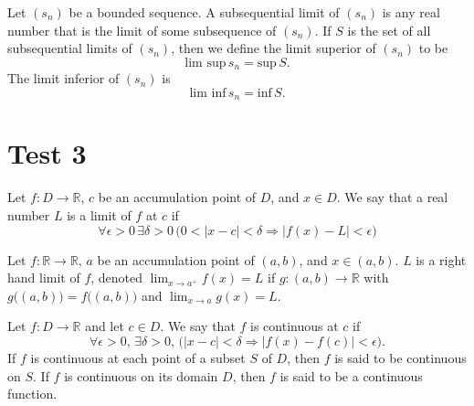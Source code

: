 \documentclass[nobib,notoc]{tufte-handout}
\begin{document}
\begin{defi}
	Let \((s_n)\) be a bounded sequence. A subsequential limit of \((s_n)\) is any real number that is the limit of some subsequence of \((s_n)\). If \(S\) is the set of all subsequential limits of \((s_n)\), then we define the limit superior of \((s_n)\) to be
	\begin{equation*}
		\text{lim sup}\,s_n=\text{sup}\,S.
	\end{equation*}
	The limit inferior of \((s_n)\) is
	\begin{equation*}
		\text{lim inf}\,s_n=\text{inf}\,S.
	\end{equation*}
\end{defi}
\section{Test 3}
\begin{defi}[Limit]
	Let \(f:D\rightarrow\mathbb{R}\), \(c\) be an accumulation point of \(D\), and \(x\in D\). We say that a real number \(L\) is a limit of \(f\) at \(c\) if
	\begin{equation*}
		\forall\epsilon>0\,\exists\delta>0\,\big(0<\lvert x-c\rvert<\delta\Rightarrow\lvert f(x)-L\rvert<\epsilon\big)
	\end{equation*}
\end{defi}
\begin{defi}
	Let \(f:\mathbb{R}\rightarrow\mathbb{R}\), \(a\) be an accumulation point of \((a,b)\), and \(x\in (a,b)\). \(L\) is a right hand limit of \(f\), denoted \(\lim_{x\rightarrow a^{+}}f(x)=L\) if \(g:(a,b)\rightarrow\mathbb{R}\) with \(g\big((a,b)\big)=f\big((a,b)\big)\) and \(\lim_{x\rightarrow a}g(x)=L\).
\end{defi}
\begin{defi}[Continuity]
	Let \(f:D\rightarrow\mathbb{R}\) and let \(c\in D\). We say that \(f\) is continuous at \(c\) if
	\begin{equation*}
		\forall\epsilon>0,\,\exists\delta>0,\,\big(\lvert x-c\rvert<\delta\Rightarrow\lvert f(x)-f(c)\rvert<\epsilon\big).
	\end{equation*}
	If \(f\) is continuous at each point of a subset \(S\) of \(D\), then \(f\) is said to be continuous on \(S\). If \(f\) is continuous on its domain \(D\), then \(f\) is said to be a continuous function.
\end{defi}
\end{document}
